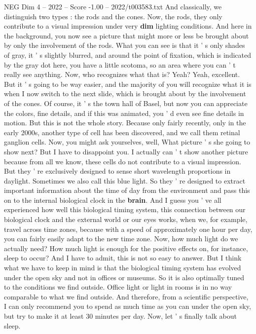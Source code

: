 \begin{textsample}{NEG Dim 4 – 2022 – Score -1.00 – 2022/t003583.txt}
And classically, we distinguish two types : the rods and the cones.
Now, the rods, they only contribute to a visual impression under very \textbf{dim} lighting conditions.
And here in the background, you now see a picture that might more or less be brought about by only the involvement of the rods.
What you can see is that it ' s only shades of gray, it ' s slightly blurred, and around the point of fixation, which is indicated by the gray dot here, you have a little scotoma, so an area where you can ' t really see anything.
Now, who recognizes what that is?
Yeah?
Yeah, excellent.
But it ' s going to be way easier, and the majority of you will recognize what it is when I now switch to the next slide, which is brought about by the involvement of the cones.
Of course, it ' s the town hall of Basel, but now you can appreciate the colors, fine details, and if this was animated, you ' d even see fine details in motion.
But this is not the whole story.
Because only fairly recently, only in the early 2000s, another type of cell has been discovered, and we call them retinal ganglion cells.
Now, you might ask yourselves, well, What picture ' s she going to show next?
But I have to disappoint you.
I actually can ' t show another picture because from all we know, these cells do not contribute to a visual impression.
But they ' re exclusively designed to sense short wavelength proportions in daylight.
Sometimes we also call this blue light.
So they ' re designed to extract important information about the time of day from the environment and pass this on to the internal biological clock in the \textbf{brain}.
And I guess you ' ve all experienced how well this biological timing system, this connection between our biological clock and the external world or our eyes works, when we, for example, travel across time zones, because with a speed of approximately one hour per day, you can fairly easily adapt to the new time zone.
Now, how much light do we actually need?
How much light is enough for the positive effects on, for instance, sleep to occur?
And I have to admit, this is not so easy to answer.
But I think what we have to keep in mind is that the biological timing system has evolved under the open sky and not in offices or museums.
So it is also optimally tuned to the conditions we find outside.
Office light or light in rooms is in no way comparable to what we find outside.
And therefore, from a scientific perspective, I can only recommend you to spend as much time as you can under the open sky, but try to make it at least 30 minutes per day.
Now, let ' s finally talk about sleep.

\end{textsample}

